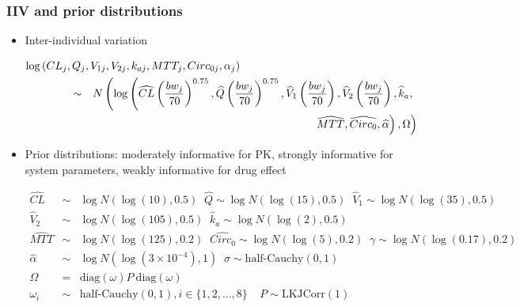 \documentclass{beamer}
\begin{document}
\begin{frame}
  \frametitle{IIV and prior distributions}

  \begin{itemize}
  \footnotesize
\item Inter-individual variation
  \begin{scriptsize}
    \begin{eqnarray*}
      \lefteqn{\log\left(CL_j,Q_j,V_{1j},V_{2j},k_{aj},MTT_j,Circ_{0j},\alpha_j\right)}\ \ \ \ \ \ \ \ \ \ \ \  \\
      &\sim& N\left(\log\left(\widehat{CL}\left(\frac{bw_j}{70}\right)^{0.75},\widehat{Q}\left(\frac{bw_j}{70}\right)^{0.75},
          \widehat{V}_1\left(\frac{bw_j}{70}\right),\widehat{V}_2\left(\frac{bw_j}{70}\right),\widehat{k}_a,\right.\right.
             \\
    & & \left. \left.\widehat{MTT}, \widehat{Circ_0}, \widehat{\alpha}\right),\Omega\right)
    \end{eqnarray*}
  \end{scriptsize}
\item Prior distributions: moderately informative for PK, strongly
  informative for system parameters, weakly informative for drug effect
  \begin{scriptsize}
    \begin{eqnarray*}
      \widehat{CL} &\sim&  \log N\left(\log(10),
                                           0.5\right) \;\;
                                           \widehat{Q}
                                           \sim  \log N\left(\log(15),
                                           0.5\right) \;\;
      \widehat{V}_1 \sim  \log N\left(\log(35), 0.5\right) \\
      \widehat{V}_2 &\sim&  \log N\left(\log(105), 0.5\right) \;\;
      \widehat{k}_a \sim
                                            \log N\left(\log(2),
                           0.5\right) \\
      \widehat{MTT} &\sim& \log N\left(\log(125), 0.2\right) \;\; 
      \widehat{Circ_0} \sim \log N\left(\log(5), 0.2\right) \;\;
      \gamma \sim \log N\left(\log(0.17), 0.2\right) \\
      \widehat{\alpha} &\sim& \log N\left(\log(3\times 10^{-4}), 1\right) \;\;
      \sigma \sim \text{half-Cauchy}\left(0, 1\right) \\
      \Omega &=& \text{diag}\left(\omega\right) P\
                      \text{diag}\left(\omega\right) \\
\omega_i &\sim& \text{half-Cauchy}\left(0, 1\right), i \in \{1, 2,
                \ldots, 8\} \ \ \ \ \
P \sim \text{LKJCorr}\left(1\right)
    \end{eqnarray*}
  \end{scriptsize}
\end{itemize}

\end{frame}
\end{document}
